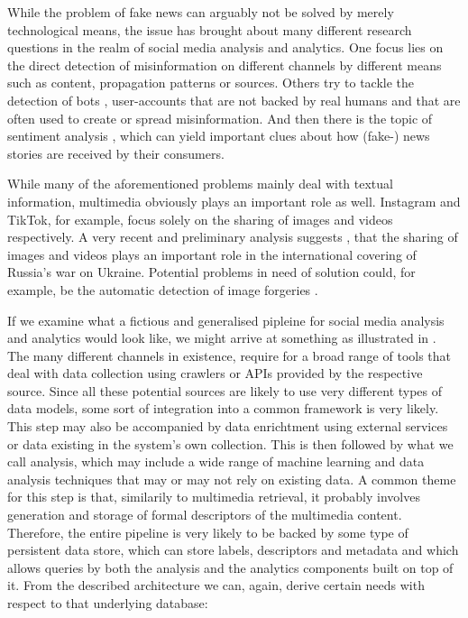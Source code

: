 While the problem of fake news can arguably not be solved by merely technological means, the issue has brought about many different research questions in the realm of social media analysis and analytics. One focus lies on the direct detection of misinformation on different channels \cite{Zhou:2020Survey} by different means such as content, propagation patterns or sources. Others try to tackle the detection of bots \cite{Cresci:2020Decade}, user-accounts that are not backed by real humans and that are often used to create or spread misinformation. And then there is the topic of sentiment analysis \cite{Yue:2019Survey}, which can yield important clues about how (fake-) news stories are received by their consumers.

While many of the aforementioned problems mainly deal with textual information, multimedia obviously plays an important role as well. Instagram and TikTok, for example, focus solely on the sharing of images and videos respectively. A very recent and preliminary analysis suggests \cite{Ciuriak:2022Role}, that the sharing of images and videos plays an important role in the international covering of Russia's war on Ukraine. Potential problems in need of solution could, for example, be the automatic detection of image forgeries \cite{Farid:2009Image}.

If we examine what a fictious and generalised pipleine for social media analysis and analytics would look like, we might arrive at something as illustrated in  \cite{Cui:2019Defend,Yang:2019XFake,Bagade:2020Kauwa}. The many different channels in existence, require for a broad range of tools that deal with data collection using crawlers or APIs provided by the respective source. Since all these potential sources are likely to use very different types of data models, some sort of integration into a common framework is very likely. This step may also be accompanied by data enrichtment using external services or data existing in the system's own collection. This is then followed by what we call analysis, which may include a wide range of machine learning and data analysis techniques that may or may not rely on existing data. A common theme for this step is that, similarily to multimedia retrieval, it probably involves generation and storage of formal descriptors of the multimedia content. Therefore, the entire pipeline is very likely to be backed by some type of persistent data store, which can store labels, descriptors and metadata and which allows queries by both the analysis and the analytics components built on top of it. From the described architecture we can, again, derive certain needs with respect to that underlying database: 

